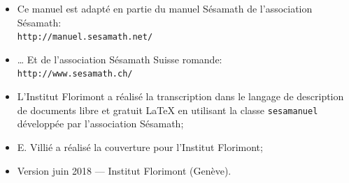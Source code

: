 \documentclass[TS]{sesamanuel}
\begin{document}
\vfill


\newpage


\begin{prerequis}
\begin{itemize}
\item  Ce manuel est adapté en partie du manuel Sésamath de l'association Sésamath:\\
\texttt{http://manuel.sesamath.net/}
\item … Et de l'association Sésamath Suisse romande:\\ \texttt{http://www.sesamath.ch/}
\item L'Institut Florimont a réalisé la transcription dans le langage de description de documents libre et gratuit \LaTeX{} en utilisant la classe \texttt{sesamanuel} développée par l'association Sésamath;
\item E. Villié a réalisé la couverture pour l'Institut Florimont;
\item Version juin 2018 --- Institut Florimont (Genève).
\end{itemize}
 \end{prerequis}

\vspace{10em}





\setcounter{chapter}{0}

\themaC
\themaG


\setcounter{page}{6}

\themaC


\themaC


\themaG


\themaC


\themaG


\themaC


\themaG


\themaC


\themaG


%

\AfficheListeMethodes
\AfficheCorriges[2]
\AfficheLexique
\end{document}

